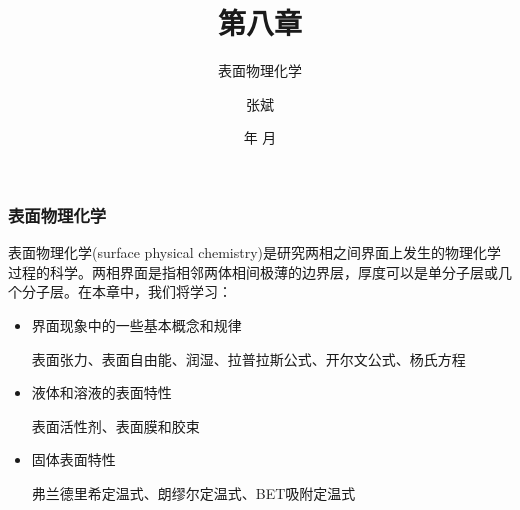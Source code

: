 \documentclass[dvipsnames, svgnames, x11names]{beamer}
\title{第八章}
\subtitle{表面物理化学}
\author{张斌}
\institute[理工系]{河北农业大学 理工系}
\date{\the\year 年 \the\month 月}
\begin{document}
\begin{frame}
	\titlepage
	\thispagestyle{empty}
	\addtocounter{framenumber}{-1}
\end{frame}

    \begin{frame}
        \frametitle{表面物理化学}
    
        表面物理化学(surface physical chemistry)是研究两相之间界面上发生的物理化学过程的科学。两相界面是指相邻两体相间极薄的边界层，厚度可以是单分子层或几个分子层。在本章中，我们将学习：
        \begin{itemize}
            \item 界面现象中的一些基本概念和规律
            
            表面张力、表面自由能、润湿、拉普拉斯公式、开尔文公式、杨氏方程
            \item 液体和溶液的表面特性
            
            表面活性剂、表面膜和胶束
            \item 固体表面特性
            
            弗兰德里希定温式、朗缪尔定温式、BET吸附定温式
        \end{itemize}

    
    \end{frame}

	\begin{frame}{}
        \begin{center}
            {\Huge {}}
        \end{center}
		\tableofcontents
		\thispagestyle{empty}
		\addtocounter{framenumber}{-1}
	\end{frame}













\end{document}
